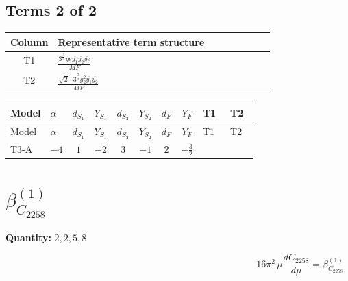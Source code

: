 \documentclass[8pt]{article}
\begin{document}
\begin{landscape}
\subsection*{Terms 2 of 2}
\begin{center}
\begin{tabular}{@{}c >{\raggedright\arraybackslash}p{0.82\linewidth}@{}}
\toprule
Column & Representative term structure \\
\midrule
T1 & \(\displaystyle \frac{3^{\frac{3}{4}} ye \overline{y_{1}} \overline{y_{2}} \overline{ye}}{MF}\) \\
\midrule
T2 & \(\displaystyle \frac{\sqrt{2} \cdot 3^{\frac{3}{4}} g_{2}^{2} \overline{y_{1}} \overline{y_{2}}}{MF}\) \\
\midrule
\bottomrule
\end{tabular}
\end{center}
\smallskip
\tiny
\begin{longtable}{@{}llcccccc >{\raggedright\arraybackslash}p{0.21\linewidth} >{\raggedright\arraybackslash}p{0.21\linewidth}@{}}
\toprule
Model & $\alpha$ & $d_{S_1}$ & $Y_{S_1}$ & $d_{S_2}$ & $Y_{S_2}$ & $d_F$ & $Y_F$ & T1 & T2 \\
\midrule
\endfirsthead
\toprule
Model & $\alpha$ & $d_{S_1}$ & $Y_{S_1}$ & $d_{S_2}$ & $Y_{S_2}$ & $d_F$ & $Y_F$ & T1 & T2 \\
\midrule
\endhead
T3-A & $-4$ & $1$ & $-2$ & $3$ & $-1$ & $2$ & $-\frac{3}{2}$ & \scriptsize\adjustbox{max width=\linewidth}{$\begin{gathered} - \frac{3^{\frac{3}{4}} ye \overline{y_{1}} \overline{y_{2}} \overline{ye}}{12 MF}\end{gathered}$} & \scriptsize\adjustbox{max width=\linewidth}{$\begin{gathered} \frac{\sqrt{2} \cdot 3^{\frac{3}{4}} g_{2}^{2} \overline{y_{1}} \overline{y_{2}}}{3 MF}\end{gathered}$} \\
\midrule
\bottomrule
\end{longtable}
\clearpage
\section*{$\beta_{C_{2258}}^{(1)}$}
\noindent\textbf{Quantity: }$\mathrm{2,2,5,8}$\par\smallskip
\[16\pi^2\,\mu\frac{d C_{2258}}{d\mu}=\beta_{C_{2258}}^{(1)}\]

\end{landscape}
\end{document}
